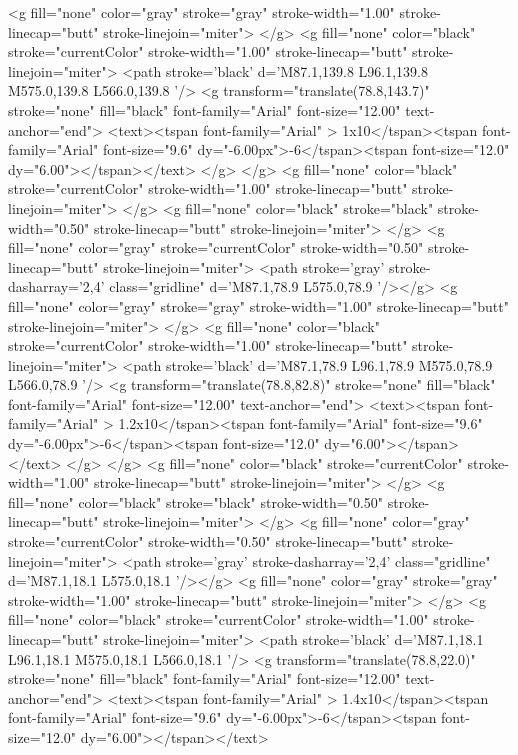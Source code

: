 <g fill="none" color="gray" stroke="gray" stroke-width="1.00" stroke-linecap="butt" stroke-linejoin="miter">
</g>
<g fill="none" color="black" stroke="currentColor" stroke-width="1.00" stroke-linecap="butt" stroke-linejoin="miter">
	<path stroke='black'  d='M87.1,139.8 L96.1,139.8 M575.0,139.8 L566.0,139.8  '/>	<g transform="translate(78.8,143.7)" stroke="none" fill="black" font-family="Arial" font-size="12.00"  text-anchor="end">
		<text><tspan font-family="Arial" > 1x10</tspan><tspan font-family="Arial"  font-size="9.6" dy="-6.00px">-6</tspan><tspan font-size="12.0" dy="6.00"></tspan></text>
	</g>
</g>
<g fill="none" color="black" stroke="currentColor" stroke-width="1.00" stroke-linecap="butt" stroke-linejoin="miter">
</g>
<g fill="none" color="black" stroke="black" stroke-width="0.50" stroke-linecap="butt" stroke-linejoin="miter">
</g>
<g fill="none" color="gray" stroke="currentColor" stroke-width="0.50" stroke-linecap="butt" stroke-linejoin="miter">
	<path stroke='gray' stroke-dasharray='2,4' class="gridline"  d='M87.1,78.9 L575.0,78.9  '/></g>
<g fill="none" color="gray" stroke="gray" stroke-width="1.00" stroke-linecap="butt" stroke-linejoin="miter">
</g>
<g fill="none" color="black" stroke="currentColor" stroke-width="1.00" stroke-linecap="butt" stroke-linejoin="miter">
	<path stroke='black'  d='M87.1,78.9 L96.1,78.9 M575.0,78.9 L566.0,78.9  '/>	<g transform="translate(78.8,82.8)" stroke="none" fill="black" font-family="Arial" font-size="12.00"  text-anchor="end">
		<text><tspan font-family="Arial" > 1.2x10</tspan><tspan font-family="Arial"  font-size="9.6" dy="-6.00px">-6</tspan><tspan font-size="12.0" dy="6.00"></tspan></text>
	</g>
</g>
<g fill="none" color="black" stroke="currentColor" stroke-width="1.00" stroke-linecap="butt" stroke-linejoin="miter">
</g>
<g fill="none" color="black" stroke="black" stroke-width="0.50" stroke-linecap="butt" stroke-linejoin="miter">
</g>
<g fill="none" color="gray" stroke="currentColor" stroke-width="0.50" stroke-linecap="butt" stroke-linejoin="miter">
	<path stroke='gray' stroke-dasharray='2,4' class="gridline"  d='M87.1,18.1 L575.0,18.1  '/></g>
<g fill="none" color="gray" stroke="gray" stroke-width="1.00" stroke-linecap="butt" stroke-linejoin="miter">
</g>
<g fill="none" color="black" stroke="currentColor" stroke-width="1.00" stroke-linecap="butt" stroke-linejoin="miter">
	<path stroke='black'  d='M87.1,18.1 L96.1,18.1 M575.0,18.1 L566.0,18.1  '/>	<g transform="translate(78.8,22.0)" stroke="none" fill="black" font-family="Arial" font-size="12.00"  text-anchor="end">
		<text><tspan font-family="Arial" > 1.4x10</tspan><tspan font-family="Arial"  font-size="9.6" dy="-6.00px">-6</tspan><tspan font-size="12.0" dy="6.00"></tspan></text>
